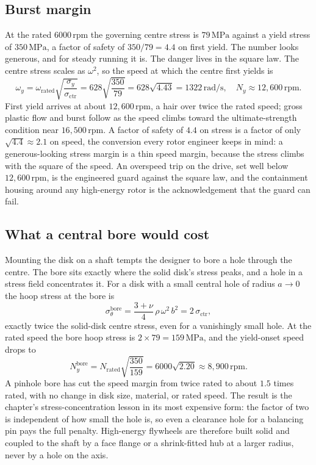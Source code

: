 

\subsection{Burst margin}

At the rated $6000\,\text{rpm}$ the governing centre stress is
$79\,\text{MPa}$ against a yield stress of $350\,\text{MPa}$, a factor
of safety of $350/79 = 4.4$ on first yield. The number looks generous,
and for steady running it is. The danger lives in the square law. The
centre stress scales as $\omega^2$, so the speed at which the centre
first yields is
\[
\omega_y = \omega_{\text{rated}}\sqrt{\frac{\sigma_y}{\sigma_{\text{ctr}}}}
= 628\sqrt{\frac{350}{79}} = 628\sqrt{4.43} = 1322\,\si{\radian\per
\second}, \quad N_y \approx 12{,}600\,\text{rpm}.
\]
First yield arrives at about $12{,}600\,\text{rpm}$, a hair over twice
the rated speed; gross plastic flow and burst follow as the speed climbs
toward the ultimate-strength condition near $16{,}500\,\text{rpm}$.
A factor of safety of $4.4$ on stress is a factor of only $\sqrt{4.4}
\approx 2.1$ on speed, the conversion every rotor engineer keeps in
mind: a generous-looking stress margin is a thin speed margin, because
the stress climbs with the square of the speed. An overspeed trip on the
drive, set well below $12{,}600\,\text{rpm}$, is the engineered guard
against the square law, and the containment housing around any
high-energy rotor is the acknowledgement that the guard can fail.

\subsection{What a central bore would cost}

Mounting the disk on a shaft tempts the designer to bore a hole through
the centre. The bore sits exactly where the solid disk's stress peaks,
and a hole in a stress field concentrates it. For a disk with a small
central hole of radius $a \to 0$ the hoop stress at the bore is
\[
\sigma_\theta^{\text{bore}} = \frac{3+\nu}{4}\,\rho\,\omega^2\,b^2 =
2\,\sigma_{\text{ctr}},
\]
exactly twice the solid-disk centre stress, even for a vanishingly small
hole. At the rated speed the bore hoop stress is $2 \times 79 = 159\,
\text{MPa}$, and the yield-onset speed drops to
\[
N_y^{\text{bore}} = N_{\text{rated}}\sqrt{\frac{350}{159}} = 6000
\sqrt{2.20} \approx 8{,}900\,\text{rpm}.
\]
A pinhole bore has cut the speed margin from twice rated to about $1.5$
times rated, with no change in disk size, material, or rated speed. The
result is the chapter's stress-concentration lesson in its most
expensive form: the factor of two is independent of how small the hole
is, so even a clearance hole for a balancing pin pays the full penalty.
High-energy flywheels are therefore built solid and coupled to the shaft
by a face flange or a shrink-fitted hub at a larger radius, never by a
hole on the axis.

